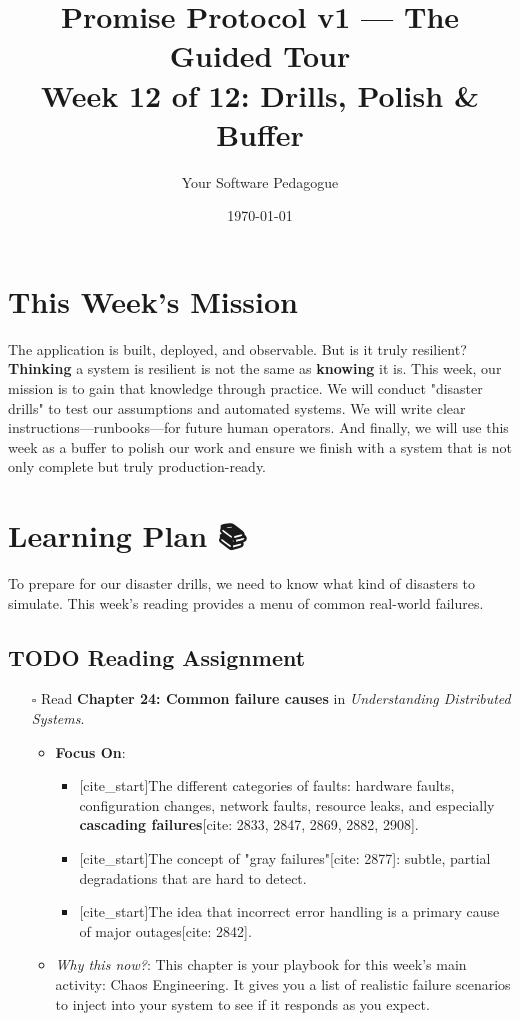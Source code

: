 \documentclass[11pt]{article}
\author{Your Software Pedagogue}
\date{\today}
\title{Promise Protocol v1 — The Guided Tour\\\medskip
\large Week 12 of 12: Drills, Polish \& Buffer}
\begin{document}
\maketitle
\setcounter{tocdepth}{2}
\tableofcontents

\section{This Week's Mission 🎯}
\label{sec:org1f90b45}
The application is built, deployed, and observable. But is it truly resilient? \textbf{Thinking} a system is resilient is not the same as \textbf{knowing} it is. This week, our mission is to gain that knowledge through practice. We will conduct "disaster drills" to test our assumptions and automated systems. We will write clear instructions—runbooks—for future human operators. And finally, we will use this week as a buffer to polish our work and ensure we finish with a system that is not only complete but truly production-ready.
\section{Learning Plan 📚}
\label{sec:org34fedbe}
To prepare for our disaster drills, we need to know what kind of disasters to simulate. This week's reading provides a menu of common real-world failures.
\subsection{{\bfseries\sffamily TODO} Reading Assignment}
\label{sec:org599804a}
\begin{itemize}
\item[{$\square$}] Read \textbf{Chapter 24: Common failure causes} in \emph{Understanding Distributed Systems}.
\begin{itemize}
\item \textbf{Focus On}:
\begin{itemize}
\item {[}cite\_start]The different categories of faults: hardware faults, configuration changes, network faults, resource leaks, and especially \textbf{cascading failures}{[}cite: 2833, 2847, 2869, 2882, 2908].
\item {[}cite\_start]The concept of "gray failures"[cite: 2877]: subtle, partial degradations that are hard to detect.
\item {[}cite\_start]The idea that incorrect error handling is a primary cause of major outages[cite: 2842].
\end{itemize}
\item \emph{Why this now?}: This chapter is your playbook for this week's main activity: Chaos Engineering. It gives you a list of realistic failure scenarios to inject into your system to see if it responds as you expect.
\end{itemize}
\end{itemize}
\end{document}

